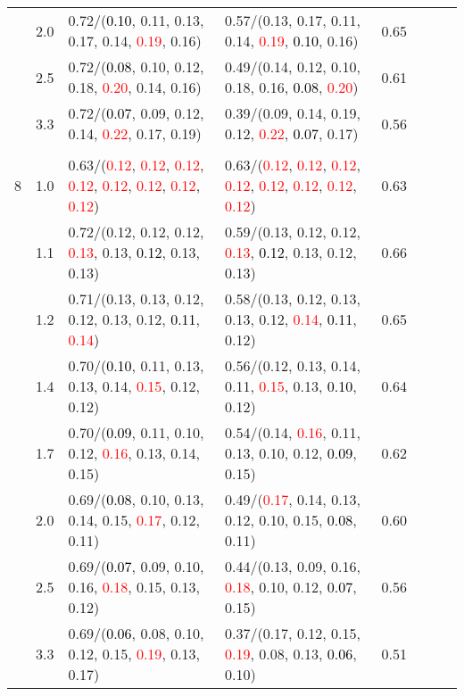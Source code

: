 \documentclass[10pt,a4paper]{report}
\begin{document}
\begin{table}[!htbp]
\begin{center}
{\begin{tabular}{ccllcccc}
			&2.0&0.72/(\textcolor{black}{0.10}, 0.11, 0.13, 0.17, 0.14, \textcolor{red}{0.19}, 0.16)&0.57/(0.13, 0.17, 0.11, 0.14, \textcolor{red}{0.19}, \textcolor{black}{0.10}, 0.16)&0.65\\
			&2.5&0.72/(\textcolor{black}{0.08}, 0.10, 0.12, 0.18, \textcolor{red}{0.20}, 0.14, 0.16)&0.49/(0.14, 0.12, 0.10, 0.18, 0.16, \textcolor{black}{0.08}, \textcolor{red}{0.20})&0.61\\
			&3.3&0.72/(\textcolor{black}{0.07}, 0.09, 0.12, 0.14, \textcolor{red}{0.22}, 0.17, 0.19)&0.39/(0.09, 0.14, 0.19, 0.12, \textcolor{red}{0.22}, \textcolor{black}{0.07}, 0.17)&0.56\\
			&&&&\\
			8			&1.0&0.63/(\textcolor{red}{0.12}, \textcolor{red}{0.12}, \textcolor{red}{0.12}, \textcolor{red}{0.12}, \textcolor{red}{0.12}, \textcolor{red}{0.12}, \textcolor{red}{0.12}, \textcolor{red}{0.12})&0.63/(\textcolor{red}{0.12}, \textcolor{red}{0.12}, \textcolor{red}{0.12}, \textcolor{red}{0.12}, \textcolor{red}{0.12}, \textcolor{red}{0.12}, \textcolor{red}{0.12}, \textcolor{red}{0.12})&0.63\\
			&1.1&0.72/(0.12, 0.12, 0.12, \textcolor{red}{0.13}, 0.13, \textcolor{black}{0.12}, 0.13, 0.13)&0.59/(0.13, 0.12, 0.12, \textcolor{red}{0.13}, \textcolor{black}{0.12}, 0.13, 0.12, 0.13)&0.66\\
			&1.2&0.71/(0.13, 0.13, 0.12, 0.12, 0.13, 0.12, \textcolor{black}{0.11}, \textcolor{red}{0.14})&0.58/(0.13, 0.12, 0.13, 0.13, 0.12, \textcolor{red}{0.14}, \textcolor{black}{0.11}, 0.12)&0.65\\
			&1.4&0.70/(\textcolor{black}{0.10}, 0.11, 0.13, 0.13, 0.14, \textcolor{red}{0.15}, 0.12, 0.12)&0.56/(0.12, 0.13, 0.14, 0.11, \textcolor{red}{0.15}, 0.13, \textcolor{black}{0.10}, 0.12)&0.64\\
			&1.7&0.70/(\textcolor{black}{0.09}, 0.11, 0.10, 0.12, \textcolor{red}{0.16}, 0.13, 0.14, 0.15)&0.54/(0.14, \textcolor{red}{0.16}, 0.11, 0.13, 0.10, 0.12, \textcolor{black}{0.09}, 0.15)&0.62\\
			&2.0&0.69/(\textcolor{black}{0.08}, 0.10, 0.13, 0.14, 0.15, \textcolor{red}{0.17}, 0.12, 0.11)&0.49/(\textcolor{red}{0.17}, 0.14, 0.13, 0.12, 0.10, 0.15, \textcolor{black}{0.08}, 0.11)&0.60\\
			&2.5&0.69/(\textcolor{black}{0.07}, 0.09, 0.10, 0.16, \textcolor{red}{0.18}, 0.15, 0.13, 0.12)&0.44/(0.13, 0.09, 0.16, \textcolor{red}{0.18}, 0.10, 0.12, \textcolor{black}{0.07}, 0.15)&0.56\\
			&3.3&0.69/(\textcolor{black}{0.06}, 0.08, 0.10, 0.12, 0.15, \textcolor{red}{0.19}, 0.13, 0.17)&0.37/(0.17, 0.12, 0.15, \textcolor{red}{0.19}, 0.08, 0.13, \textcolor{black}{0.06}, 0.10)&0.51\\
			\bottomrule
		\end{tabular}}
	\end{center}
\end{table}
\end{document}
